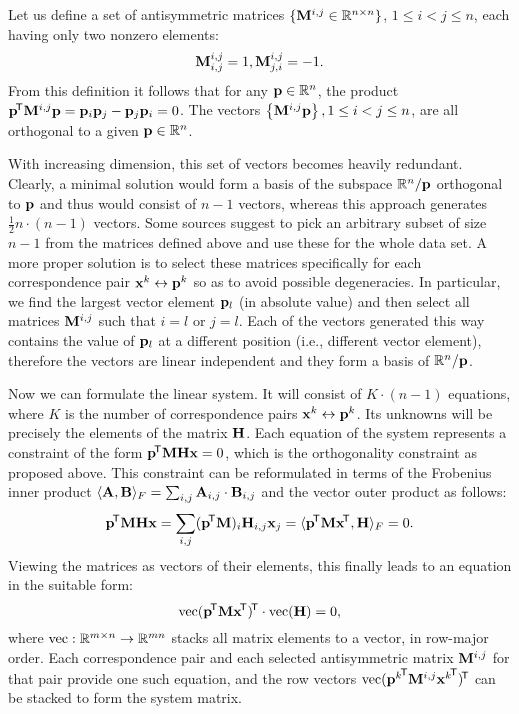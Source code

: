 Let us define a set of antisymmetric matrices $\{\mathbf{M}^{i, j} \in \mathbb{R}^{n \times n}\}$, $1 \leq i < j \leq n$, each having only two nonzero elements:
$$\mathbf{M}^{i, j}_{i, j} = 1,
\mathbf{M}^{i, j}_{j, i} = -1.$$
From this definition it follows that for any $\mathbf{p} \in \mathbb{R}^n$, the product $\mathbf{p}^{\!\mathsf{T}} \mathbf{M}^{i, j} \mathbf{p} = \mathbf{p}_{i} \mathbf{p}_{j} - \mathbf{p}_{j} \mathbf{p}_{i} = 0$.
The vectors $\left\{ \mathbf{M}^{i, j} \mathbf{p} \right\}, 1 \leq i < j \leq n$, are all orthogonal to a given $\mathbf{p} \in \mathbb{R}^n$.

With increasing dimension, this set of vectors becomes heavily redundant.
Clearly, a minimal solution would form a basis of the subspace $\mathbb{R}^n / \mathbf{p}$ orthogonal to $\mathbf{p}$ and thus would consist of $n - 1$ vectors, whereas this approach generates $\frac {1} {2} n \cdot (n - 1)$ vectors.
Some sources\cite{MVG} suggest to pick an arbitrary subset of size $n - 1$ from the matrices defined above and use these for the whole data set.
A more proper solution is to select these matrices specifically for each correspondence pair $\mathbf{x}^k \leftrightarrow \mathbf{p}^k$ so as to avoid possible degeneracies.
In particular, we find the largest vector element $\mathbf{p}_l$ (in absolute value) and then select all matrices $\mathbf{M}^{i, j}$ such that $i = l$ or $j = l$.
Each of the vectors generated this way contains the value of $\mathbf{p}_l$ at a different position (i.e., different vector element), therefore the vectors are linear independent and they form a basis of $\mathbb{R}^n / \mathbf{p}$.

Now we can formulate the linear system.
It will consist of $K \cdot (n - 1)$ equations, where $K$ is the number of correspondence pairs $\mathbf{x}^k \leftrightarrow \mathbf{p}^k$.
Its unknowns will be precisely the elements of the matrix $\mathbf{H}$.
Each equation of the system represents a constraint of the form $\mathbf{p}^{\!\mathsf{T}} \mathbf{M} \mathbf{H} \mathbf{x} = 0$, which is the orthogonality constraint as proposed above.
This constraint can be reformulated in terms of the Frobenius inner product $\langle \mathbf{A}, \mathbf{B} \rangle_F = \sum_{i, j} \mathbf{A}_{i, j} \cdot \mathbf{B}_{i, j}$ and the vector outer product as follows:
$$\mathbf{p}^{\!\mathsf{T}} \mathbf{M} \mathbf{H} \mathbf{x} = \sum_{i, j} (\mathbf{p}^{\!\mathsf{T}} \mathbf{M})_i \mathbf{H}_{i, j} \mathbf{x}_j = \langle \mathbf{p}^{\!\mathsf{T}} \mathbf{M} \mathbf{x}^{\!\mathsf{T}}, \mathbf{H} \rangle_F = 0.$$
Viewing the matrices as vectors of their elements, this finally leads to an equation in the suitable form:
$$\textrm{vec} (\mathbf{p}^{\!\mathsf{T}} \mathbf{M} \mathbf{x}^{\!\mathsf{T}})^{\!\mathsf{T}} \cdot \textrm{vec}(\mathbf{H}) = 0,$$
where $\textrm{vec} : \mathbb{R}^{m \times n} \rightarrow \mathbb{R}^{mn}$ stacks all matrix elements to a vector, in row-major order.
Each correspondence pair and each selected antisymmetric matrix $\mathbf{M}^{i, j}$ for that pair provide one such equation, and the row vectors $\textrm{vec} ({\mathbf{p}^k}^{\!\mathsf{T}} \mathbf{M}^{i, j} {\mathbf{x}^k}^{\!\mathsf{T}})^{\!\mathsf{T}}$ can be stacked to form the system matrix.

